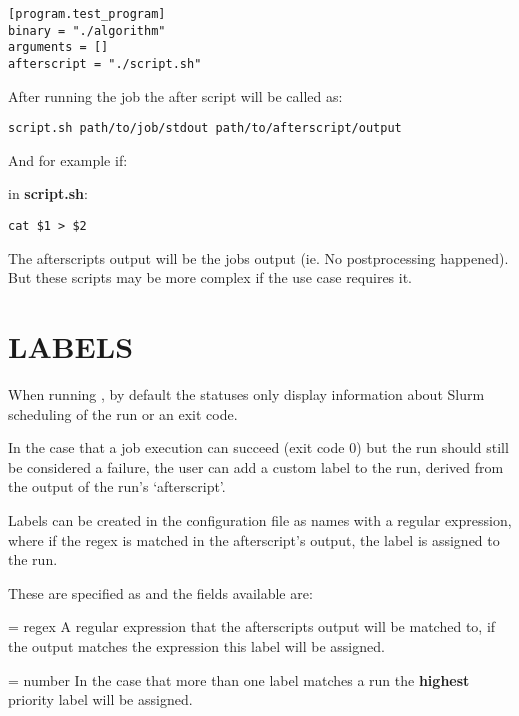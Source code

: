 \documentclass[a4paper,english]{article}
\begin{document}
\begin{adjustwidth}{18pt}{0pt}
            \begin{verbatim}
[program.test_program]
binary = "./algorithm"
arguments = []
afterscript = "./script.sh"
            \end{verbatim}

            After running the job the after script will be called as:

            \begin{verbatim}
script.sh path/to/job/stdout path/to/afterscript/output
            \end{verbatim}

            And for example if:

            in \textbf{script.sh}:
            \begin{verbatim}
cat $1 > $2
            \end{verbatim}

            The afterscripts output will be the jobs output (ie. No postprocessing happened).
            But these scripts may be more complex if the use case requires it.

    \section{LABELS}

      When running  , by default the statuses only display information
      about Slurm scheduling of the run or an exit code.

      In the case that a job execution can succeed (exit code 0) but the run should still
      be considered a failure, the user can add a custom label to the run, derived from
      the output of the run's `afterscript'.

      Labels can be created in the configuration file as names with a regular expression,
      where if the regex is matched in the afterscript's output, the label is assigned to the run.

      These are specified as  and the fields available are:

      \begin{Description}[Options]\setlength{\itemsep}{0cm}
          \item[\Opt{regex} = regex]
          A regular expression that the afterscripts output will be matched to,
          if the output matches the expression this label will be assigned.

          \item[\Opt{priority} = number]
          In the case that more than one label matches a run the \textbf{highest}
          priority label will be assigned.


\end{Description}
\end{adjustwidth}
\end{document}
